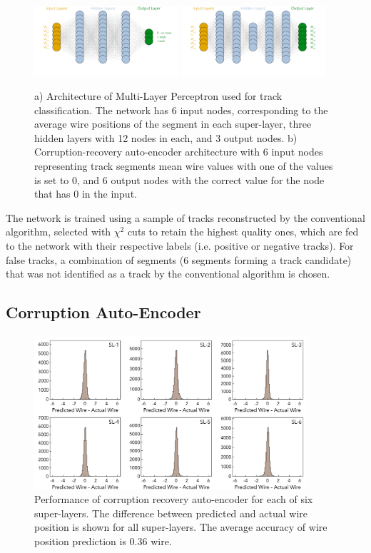 \documentclass{webofc}
\begin{document}
 \begin{figure}[!ht]
\begin{center}
  \includegraphics[width=2.1in]{images/mlp_diagram.pdf}
  \includegraphics[width=2.1in]{images/aue_diagram.pdf}
\caption {a) Architecture of Multi-Layer Perceptron used for track classification. The network has 6 input nodes,
corresponding to the average wire positions of the segment in each super-layer, three hidden layers with 12 nodes 
in each, and 3 output nodes. b) Corruption-recovery auto-encoder architecture with 6 input nodes representing track segments 
mean wire values with one of the values is set to 0, and 6 output nodes with the correct value for the node 
that has 0 in the input. }
 \label{mlp:architecture}
 \end{center}
\end{figure}

The network is trained using a sample of tracks reconstructed by the conventional algorithm, selected with 
$\chi^2$ cuts to retain the highest quality ones, which are fed to the network with their respective labels 
(i.e. positive or negative tracks). For false tracks, a combination of segments (6 segments forming a track 
candidate) that was not identified as a track by the conventional algorithm is chosen.
 
 \subsection{Corruption Auto-Encoder}
 
 \begin{figure}[!ht]
\begin{center}
\includegraphics[width=4.0in]{images/encoder_performance.pdf}
\caption {Performance of corruption recovery auto-encoder for each of six super-layers. The difference between predicted and actual 
wire position is shown for all super-layers. The average accuracy of wire position prediction is  $0.36$ wire.}
 \label{autoencoder:performance}
 \end{center}
\end{figure}
\end{document}

